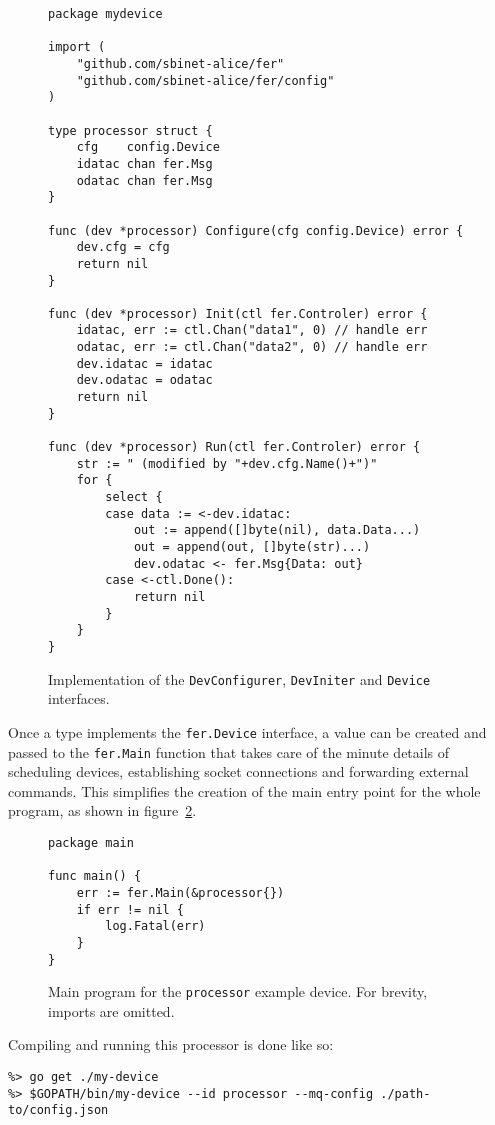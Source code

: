 \documentclass{webofc}
\begin{document}
\begin{figure}[h]
	\centering
\begin{verbatim}
package mydevice

import (
	"github.com/sbinet-alice/fer"
	"github.com/sbinet-alice/fer/config"
)

type processor struct {
	cfg    config.Device
	idatac chan fer.Msg
	odatac chan fer.Msg
}

func (dev *processor) Configure(cfg config.Device) error {
	dev.cfg = cfg
	return nil
}

func (dev *processor) Init(ctl fer.Controler) error {
	idatac, err := ctl.Chan("data1", 0) // handle err
	odatac, err := ctl.Chan("data2", 0) // handle err
	dev.idatac = idatac
	dev.odatac = odatac
	return nil
}

func (dev *processor) Run(ctl fer.Controler) error {
	str := " (modified by "+dev.cfg.Name()+")"
	for {
		select {
		case data := <-dev.idatac:
			out := append([]byte(nil), data.Data...)
			out = append(out, []byte(str)...)
			dev.odatac <- fer.Msg{Data: out}
		case <-ctl.Done():
			return nil
		}
	}
}
\end{verbatim}
\caption{Implementation of the \texttt{DevConfigurer}, \texttt{DevIniter} and \texttt{Device} interfaces.}
\label{fig-fer-processor}
\end{figure}

Once a type implements the \texttt{fer.Device} interface, a value can be created and passed to the \texttt{fer.Main} function that takes care of the minute details of scheduling devices, establishing socket connections and forwarding external commands.
This simplifies the creation of the main entry point for the whole program, as shown in figure~\ref{fig-fer-main}.

\begin{figure}[h]
	\centering
\begin{verbatim}
package main

func main() {
	err := fer.Main(&processor{})
	if err != nil {
		log.Fatal(err)
	}
}
\end{verbatim}
	\caption{Main program for the \texttt{processor} example device. For brevity, imports are omitted.}
	\label{fig-fer-main}
\end{figure}

Compiling and running this processor is done like so:
\begin{verbatim}
%> go get ./my-device
%> $GOPATH/bin/my-device --id processor --mq-config ./path-to/config.json
\end{verbatim}
\end{document}
